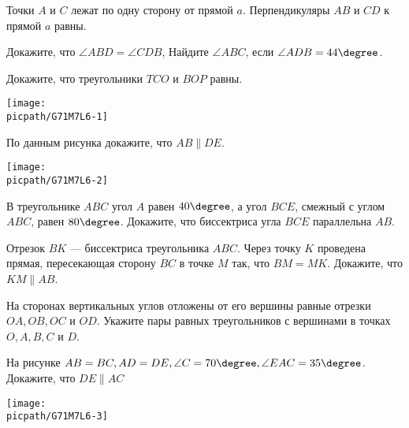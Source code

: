 \begin{class}[number=6]
	\begin{listofex}
		\item Точки \(A\) и \(C\) лежат по одну сторону от прямой \(a\). Перпендикуляры \(AB\) и \(CD\) к прямой \(a\) равны. %
		\begin{tasks}
			\task Докажите, что \( \angle ABD = \angle CDB \),
			\task Найдите  \( \angle ABC \), если \( \angle ADB =44 \degree \).
		\end{tasks}
		\item 
		\begin{minipage}[t]{\bodywidth}
			Докажите, что треугольники \(TCO\) и \( BOP \) равны.
		\end{minipage}
		\hspace{0.02\linewidth}
		\begin{minipage}[t]{\picwidth}
			\texttt{[image: \\picpath/G71M7L6-1]}
		\end{minipage}
		\item %
		\begin{minipage}[t]{\bodywidth}
			По данным рисунка докажите, что \(AB \parallel DE\).
		\end{minipage}
		\hspace{0.02\linewidth}
		\begin{minipage}[t]{\picwidth}
			\texttt{[image: \\picpath/G71M7L6-2]}
		\end{minipage}
		\item В треугольнике \(ABC\) угол \(A\) равен \(40 \degree\), а угол \(BCE\), смежный с углом \(ABC\), равен \(80 \degree\). Докажите, что биссектриса угла \(BCE\) параллельна \(AB\). %
		
		\item Отрезок \(BK\) --- биссектриса треугольника \(ABC\). Через точку \(K\) проведена прямая, пересекающая сторону \(BC\) в точке \(M\) так, что \(BM=MK\). Докажите, что \(KM \parallel AB\). 
		\item На сторонах вертикальных углов отложены от его вершины равные отрезки \(OA, OB, OC\) и \(OD\). Укажите пары равных треугольников с вершинами в точках \(O, A, B, C\) и \(D\).
		\item 
		\begin{minipage}[t]{\bodywidth}
			На рисунке \(AB=BC, AD=DE, \angle C = 70 \degree, \angle EAC = 35 \degree\). Докажите, что \(DE \parallel AC\)
		\end{minipage}
		\hspace{0.02\linewidth}
		\begin{minipage}[t]{\picwidth}
			\texttt{[image: \\picpath/G71M7L6-3]}
		\end{minipage}
	\end{listofex}
\end{class}

